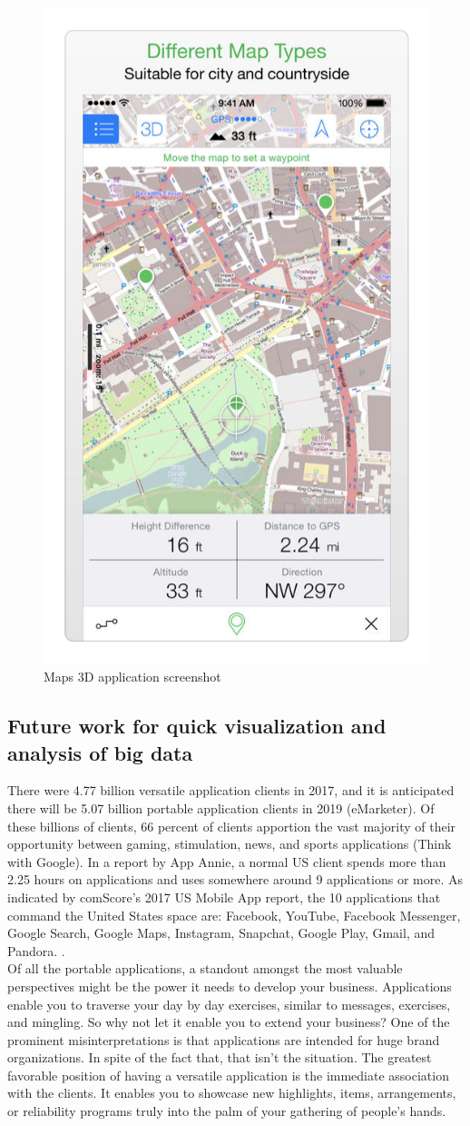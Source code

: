 \begin{itemize}
    \begin{figure}[H]
            \centering
            \includegraphics[width=0.25\linewidth]{figures/ch1/map_3d.png}
            \caption{\label{fig:map_3d} Maps 3D application screenshot \cite{Spatial_Agent}}
    \end{figure}
\end{itemize}

  
\subsection{Future work for quick visualization and analysis of big data}

There were 4.77 billion versatile application clients in 2017, and it is anticipated there will be 5.07 billion portable application clients in 2019 (eMarketer). Of these billions of clients, 66 percent of clients apportion the vast majority of their opportunity between gaming, stimulation, news, and sports applications (Think with Google). In a report by App Annie\cite{AppAnnie}, a normal US client spends more than 2.25 hours on applications and uses somewhere around 9 applications or more. As indicated by comScore's 2017 US Mobile App report, the 10 applications that command the United States space are: Facebook, YouTube, Facebook Messenger, Google Search, Google Maps, Instagram, Snapchat, Google Play, Gmail, and Pandora. \cite{eBiz_solutions}. \\
Of all the portable applications, a standout amongst the most valuable perspectives might be the power it needs to develop your business. Applications enable you to traverse your day by day exercises, similar to messages, exercises, and mingling. So why not let it enable you to extend your business? One of the prominent misinterpretations is that applications are intended for huge brand organizations. In spite of the fact that, that isn't the situation. The greatest favorable position of having a versatile application is the immediate association with the clients. It enables you to showcase new highlights, items, arrangements, or reliability programs truly into the palm of your gathering of people's hands.


